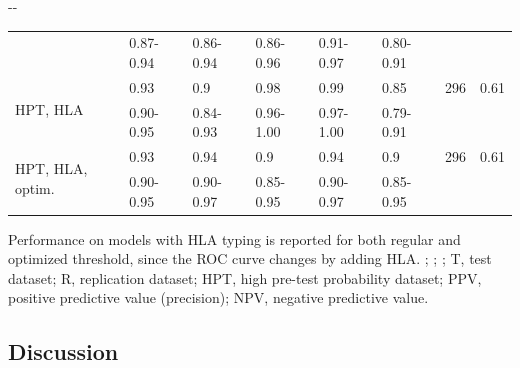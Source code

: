 \begin{table}
\begin{adjustwidth*}{}{-\marginparwidth-\marginparsep}
\begin{threeparttable}
\begin{tabular}{@{}llllllrr@{}}
                            & 0.87-0.94     & 0.86-0.94        & 0.86-0.96        & 0.91-0.97 & 0.80-0.91 &           &                            \\
        \multirow[t]{2}{0.175\textwidth}{HPT, HLA}            & 0.93          & 0.9              & 0.98             & 0.99      & 0.85      & 296       & 0.61                       \\
                            & 0.90-0.95     & 0.84-0.93        & 0.96-1.00        & 0.97-1.00 & 0.79-0.91 &           &                            \\
        \multirow[t]{2}{0.175\textwidth}{HPT, HLA, optim.}    & 0.93          & 0.94             & 0.9              & 0.94      & 0.9       & 296       & 0.61                       \\
                            & 0.90-0.95     & 0.90-0.97        & 0.85-0.95        & 0.90-0.97 & 0.85-0.95 &           &                            \\ \bottomrule
    \end{tabular}
    \begin{tablenotes}
    \small 
    \item Performance on models with \ac{HLA} typing is reported for both regular and optimized threshold, since the \acs{ROC} curve changes by adding \ac{HLA}. %
    ; %
    ; %
    ; %
    T, test dataset; %
    R, replication dataset; %
    HPT, high pre-test probability dataset; %
    PPV, positive predictive value (precision); %
    NPV, negative predictive value.
    \end{tablenotes}
    \end{threeparttable}
    \end{adjustwidth*}
\end{table}

\subsection{Discussion}

